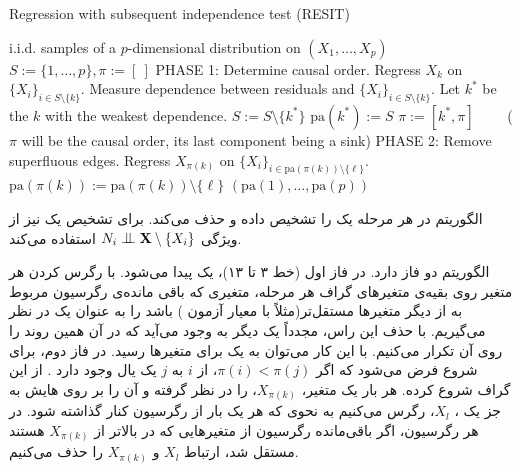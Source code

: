 \documentclass[a4paper,12pt]{article}
\newcommand{\bigCI}{\mathrel{\text{\scalebox{1.07}{$\perp\mkern-10mu\perp$}}}}
\begin{document}
\begin{latin}	
	\begin{algorithm}[h]
		\caption{Regression with subsequent independence test (RESIT)}
		\label{alg:icml}
		\begin{algorithmic}[1]
			 i.i.d. samples of a $p$-dimensional distribution on $(X_1, \ldots, X_p)$ \vspace{0.0cm}
			\STATE $S:=\{1, \ldots, p\}, \pi := [\ ]$ \vspace{0.15cm}
			\STATE PHASE 1: Determine causal order.
			\REPEAT
			\STATE Regress $X_k$ on $\{X_i\}_{i \in S \setminus \{k\}}$.%
			\STATE Measure dependence between residuals and $\{X_i\}_{i \in S \setminus \{k\}}$.  
			\ENDFOR
			\STATE Let $k^*$ be the $k$ with the weakest dependence.
			\STATE $S:=S \setminus \{k^*\}$
			\STATE $\mathrm{pa}(k^*):=S$
			\STATE $\pi := [k^*, \pi]\qquad $  ($\pi$ will be the causal order, its last component being a sink)
			 \vspace{0.15cm}
			\STATE PHASE 2: Remove superfluous edges.
			\STATE Regress $X_{\pi(k)}$ on $\{X_i\}_{i \in \mathrm{pa}(\pi(k)) \setminus \{\ell\}}$.
			\STATE $\mathrm{pa}(\pi(k)) := \mathrm{pa}(\pi(k)) \setminus \{\ell \}$ 
			\ENDIF
			\ENDFOR
			\ENDFOR
			 $(\mathrm{pa}(1), \ldots, \mathrm{pa}(p))$
		\end{algorithmic}
	\end{algorithm}
\end{latin}	
الگوریتم 
در هر مرحله یک 
را تشخیص داده و حذف می‌کند. برای تشخیص یک 
نیز از ويژگی $N_i \bigCI \mathbf{X} \setminus \{X_i\}$ استفاده می‌کند. 


الگوریتم 
دو فاز دارد. در فاز اول (خط ۳ تا ۱۳)، یک 	 پیدا می‌شود. با رگرس کردن هر متغیر روی بقیه‌ی متغیر‌های گراف هر مرحله، متغیری که باقی مانده‌ی رگرسیون مربوط به از دیگر متغیرها مستقل‌تر(مثلاً با معیار 
آزمون 
) باشد را به عنوان یک  
در نظر می‌گیریم. با حذف این راس، مجدداً یک
دیگر به وجود می‌آید که در آن همین روند را روی آن تکرار می‌کنیم. با این کار می‌توان به یک 
برای متغیرها رسید.
در فاز دوم، برای شروع  فرض می‌شود که اگر
$\pi(i) < \pi(j)$،
از $i$ به $j$ یک یال وجود دارد . از این گراف شروع کرده. هر بار یک متغیر،
$X_{\pi(k)}$،
را در نظر گرفته و آن را بر روی 
هایش به جز یک 
،
$X_l$،
رگرس می‌کنیم به نحوی که هر 
یک بار از رگرسیون کنار گذاشته شود. در هر رگرسیون، اگر باقی‌مانده رگرسیون از متغیر‌هایی که در 
بالاتر از 
$X_{\pi(k)}$
هستند مستقل شد، ارتباط $X_l$ و $X_{\pi(k)}$ را حذف می‌کنیم. 
\end{document}
